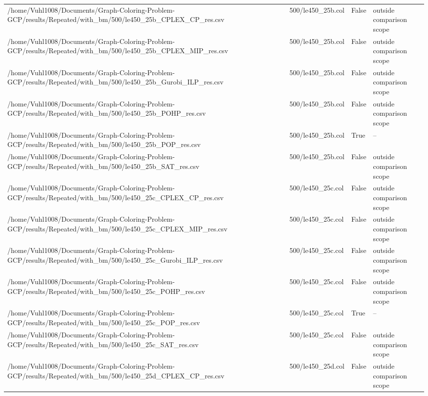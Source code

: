 \begin{table}[htbp]
\begin{tabular}{llll}
/home/Vuhl1008/Documents/Graph-Coloring-Problem-GCP/results/Repeated/with\_bm/500/le450\_25b\_CPLEX\_CP\_res.csv & 500/le450\_25b.col & False & outside comparison scope \\
/home/Vuhl1008/Documents/Graph-Coloring-Problem-GCP/results/Repeated/with\_bm/500/le450\_25b\_CPLEX\_MIP\_res.csv & 500/le450\_25b.col & False & outside comparison scope \\
/home/Vuhl1008/Documents/Graph-Coloring-Problem-GCP/results/Repeated/with\_bm/500/le450\_25b\_Gurobi\_ILP\_res.csv & 500/le450\_25b.col & False & outside comparison scope \\
/home/Vuhl1008/Documents/Graph-Coloring-Problem-GCP/results/Repeated/with\_bm/500/le450\_25b\_POHP\_res.csv & 500/le450\_25b.col & False & outside comparison scope \\
/home/Vuhl1008/Documents/Graph-Coloring-Problem-GCP/results/Repeated/with\_bm/500/le450\_25b\_POP\_res.csv & 500/le450\_25b.col & True & -- \\
/home/Vuhl1008/Documents/Graph-Coloring-Problem-GCP/results/Repeated/with\_bm/500/le450\_25b\_SAT\_res.csv & 500/le450\_25b.col & False & outside comparison scope \\
/home/Vuhl1008/Documents/Graph-Coloring-Problem-GCP/results/Repeated/with\_bm/500/le450\_25c\_CPLEX\_CP\_res.csv & 500/le450\_25c.col & False & outside comparison scope \\
/home/Vuhl1008/Documents/Graph-Coloring-Problem-GCP/results/Repeated/with\_bm/500/le450\_25c\_CPLEX\_MIP\_res.csv & 500/le450\_25c.col & False & outside comparison scope \\
/home/Vuhl1008/Documents/Graph-Coloring-Problem-GCP/results/Repeated/with\_bm/500/le450\_25c\_Gurobi\_ILP\_res.csv & 500/le450\_25c.col & False & outside comparison scope \\
/home/Vuhl1008/Documents/Graph-Coloring-Problem-GCP/results/Repeated/with\_bm/500/le450\_25c\_POHP\_res.csv & 500/le450\_25c.col & False & outside comparison scope \\
/home/Vuhl1008/Documents/Graph-Coloring-Problem-GCP/results/Repeated/with\_bm/500/le450\_25c\_POP\_res.csv & 500/le450\_25c.col & True & -- \\
/home/Vuhl1008/Documents/Graph-Coloring-Problem-GCP/results/Repeated/with\_bm/500/le450\_25c\_SAT\_res.csv & 500/le450\_25c.col & False & outside comparison scope \\
/home/Vuhl1008/Documents/Graph-Coloring-Problem-GCP/results/Repeated/with\_bm/500/le450\_25d\_CPLEX\_CP\_res.csv & 500/le450\_25d.col & False & outside comparison scope \\

\end{tabular}
\end{table}
